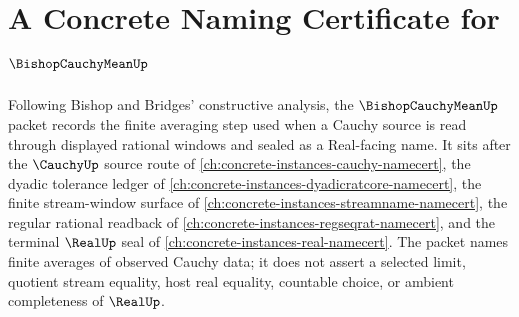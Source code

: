 \chapter{A Concrete Naming Certificate for $\BishopCauchyMeanUp$}
\label{ch:concrete-instances-bishop-cauchy-mean-namecert}

Following Bishop and Bridges' constructive analysis, the $\BishopCauchyMeanUp$ packet records the finite averaging step used when a Cauchy source is read through displayed rational windows and sealed as a Real-facing name. It sits after the $\CauchyUp$ source route of \autoref{ch:concrete-instances-cauchy-namecert}, the dyadic tolerance ledger of \autoref{ch:concrete-instances-dyadicratcore-namecert}, the finite stream-window surface of \autoref{ch:concrete-instances-streamname-namecert}, the regular rational readback of \autoref{ch:concrete-instances-regseqrat-namecert}, and the terminal $\RealUp$ seal of \autoref{ch:concrete-instances-real-namecert}. The packet names finite averages of observed Cauchy data; it does not assert a selected limit, quotient stream equality, host real equality, countable choice, or ambient completeness of $\RealUp$.

